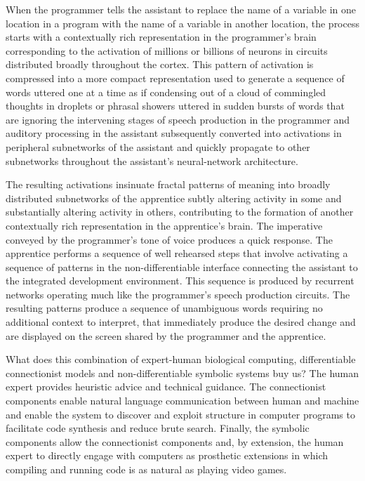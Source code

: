 

When the programmer tells the assistant to replace the name of a variable in one location in a program with the name of a variable in another location, the process starts with a contextually rich representation in the programmer’s brain corresponding to the activation of millions or billions of neurons in circuits distributed broadly throughout the cortex. This pattern of activation is compressed into a more compact representation used to generate a sequence of words uttered one at a time as if condensing out of a cloud of commingled thoughts in droplets or phrasal showers uttered in sudden bursts of words that are \emdash{} ignoring the intervening stages of speech production in the programmer and auditory processing in the assistant \emdash{} subsequently converted into activations in peripheral subnetworks of the assistant and quickly propagate to other subnetworks throughout the assistant’s neural-network architecture. 

The resulting activations insinuate fractal patterns of meaning into broadly distributed subnetworks of the apprentice subtly altering activity in some and substantially altering activity in others, contributing to the formation of another contextually rich representation in the apprentice’s brain. The imperative conveyed by the programmer’s tone of voice produces a quick response. The apprentice performs a sequence of well rehearsed steps that involve activating a sequence of patterns in the non-differentiable interface connecting the assistant to the integrated development environment. This sequence is produced by recurrent networks operating much like the programmer’s speech production circuits. The resulting patterns produce a sequence of unambiguous words \emdash{} requiring no additional context to interpret, that immediately produce the desired change and are displayed on the screen shared by the programmer and the apprentice.

What does this combination of expert-human biological computing, differentiable connectionist models and non-differentiable symbolic systems buy us? The human expert provides heuristic advice and technical guidance. The connectionist components enable natural language communication between human and machine and enable the system to discover and exploit structure in computer programs to facilitate code synthesis and reduce brute search. Finally, the symbolic components allow the connectionist components \emdash{} and, by extension, the human expert \emdash{} to directly engage with computers as prosthetic extensions in which compiling and running code is as natural as playing video games.

